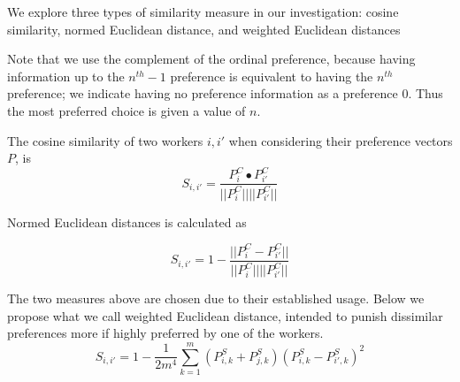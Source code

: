 We explore three types of similarity measure in our investigation: cosine similarity, normed Euclidean distance, and weighted Euclidean distances

Note that we use the complement of the ordinal preference, because having information up to the  $n^{th} - 1$ preference is equivalent to having the $n^{th}$ preference; we indicate having no preference information as a preference 0. Thus the most preferred choice is given a value of $n$. 

The cosine similarity of two workers $i, i'$ when considering their preference vectors $P$, is
\[S_{i, i'} = \frac{P^C_{i} \bullet P^C_{i'}}{||P^C_i|| ||P^C_{i'}||}\]

Normed Euclidean distances is calculated as

\[S_{i, i'} = 1- \frac{||P^C_i - P^C_{i'}||}{||P^C_i|| ||P^C_{i'}||}\]

The two measures above are chosen due to their established usage. Below we propose what we call weighted Euclidean distance, intended to punish dissimilar preferences more if highly preferred by one of the workers. 
\[S_{i, i'} = 1 - \frac{1}{2m^4} \sum_{k=1}^{m} (P^S_{i,k} + P^S_{j,k})(P^S_{i,k} - P^S_{i',k})^2\]